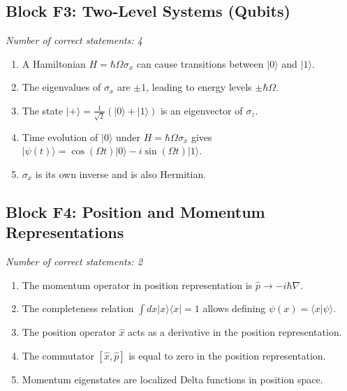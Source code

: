 \documentclass[a4paper,12pt]{article}
\begin{document}
\subsection*{Block F3: Two-Level Systems (Qubits)}
\textit{Number of correct statements: 4}
\begin{enumerate}[label=\roman*.]
    \item A Hamiltonian $H = \hbar \Omega \sigma_x$ can cause transitions between $|0\rangle$ and $|1\rangle$.
    \item The eigenvalues of $\sigma_x$ are $\pm 1$, leading to energy levels $\pm \hbar \Omega$.
    \item The state $|+\rangle = \frac{1}{\sqrt{2}}(|0\rangle + |1\rangle)$ is an eigenvector of $\sigma_z$.
    \item Time evolution of $|0\rangle$ under $H = \hbar \Omega \sigma_x$ gives $|\psi(t)\rangle = \cos(\Omega t)|0\rangle - i \sin(\Omega t)|1\rangle$.
    \item $\sigma_x$ is its own inverse and is also Hermitian.
\end{enumerate}

\subsection*{Block F4: Position and Momentum Representations}
\textit{Number of correct statements: 2}
\begin{enumerate}[label=\roman*.]
    \item The momentum operator in position representation is $\hat{p} \to -i\hbar \nabla$.
    \item The completeness relation $\int dx |x\rangle\langle x| = 1$ allows defining $\psi(x) = \langle x | \psi \rangle$.
    \item The position operator $\hat{x}$ acts as a derivative in the position representation.
    \item The commutator $[\hat{x}, \hat{p}]$ is equal to zero in the position representation.
    \item Momentum eigenstates are localized Delta functions in position space.
\end{enumerate}
\end{document}
